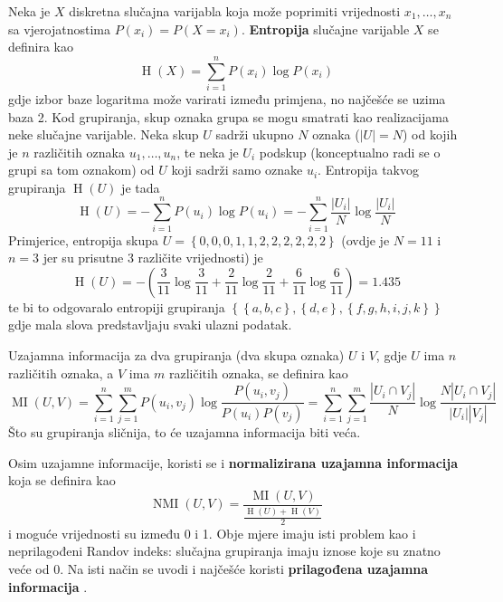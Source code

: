 \documentclass[times, utf8, zavrsni]{fer}
\begin{document}
Neka je $X$ diskretna slučajna varijabla koja može poprimiti vrijednosti $x_1, \dots, x_n$ sa vjerojatnostima $P \left(x_i\right) = P \left(X = x_i\right)$. \textbf{Entropija} slučajne varijable $X$ se definira kao
\[\operatorname{H} \left(X\right) = \sum_{i=1}^{n} P \left(x_i\right) \log{P \left(x_i\right)}\]
gdje izbor baze logaritma može varirati između primjena, no najčešće se uzima baza 2. Kod grupiranja, skup oznaka grupa se mogu smatrati kao realizacijama neke slučajne varijable. Neka skup $U$ sadrži ukupno $N$ oznaka ($\vert U \vert = N$) od kojih je $n$ različitih oznaka $u_1, \dots, u_n$, te neka je $U_i$ podskup (konceptualno radi se o grupi sa tom oznakom) od $U$ koji sadrži samo oznake $u_i$. Entropija takvog grupiranja $\operatorname{H} \left(U\right)$ je tada
\[\operatorname{H} \left(U\right) = 
- \sum_{i=1}^{n} P \left(u_i\right) \log{P \left(u_i\right)}
= - \sum_{i=1}^{n} \frac{\left\vert U_i \right\vert}{N}
\log{\frac{\left\vert U_i \right\vert}{N}}\]
Primjerice, entropija skupa $U = \left\{0, 0, 0, 1, 1, 2, 2, 2, 2, 2, 2\right\}$ (ovdje je $N = 11$ i $n = 3$ jer su prisutne 3 različite vrijednosti) je
\[\operatorname{H} \left(U\right) = - \left(\frac{3}{11} \log{\frac{3}{11}}
+ \frac{2}{11} \log{\frac{2}{11}}
+ \frac{6}{11} \log{\frac{6}{11}}\right) = 1.435
\]
te bi to odgovaralo entropiji grupiranja
$\left\{\left\{a, b, c\right\}, \left\{d, e\right\}, \left\{f, g, h, i, j, k\right\}\right\}$ gdje mala slova predstavljaju svaki ulazni podatak.

Uzajamna informacija za dva grupiranja (dva skupa oznaka) $U$ i $V$, gdje $U$ ima $n$ različitih oznaka, a $V$ ima $m$ različitih oznaka, se definira kao
\[\operatorname{MI} \left(U, V\right) = \sum_{i=1}^{n} \sum_{j=1}^{m} 
P \left(u_i, v_j\right) \log{\frac{P \left(u_i, v_j\right)}{P \left(u_i\right) P \left(v_j\right)}}
= \sum_{i=1}^{n} \sum_{j=1}^{m} 
\frac{\left\vert U_i \cap V_j \right\vert}{N} \log{\frac{N \left\vert U_i \cap V_j \right\vert}{\left\vert U_i \right\vert  \left\vert V_j \right\vert}}
\]
Što su grupiranja sličnija, to će uzajamna informacija biti veća.

Osim uzajamne informacije, koristi se i \textbf{normalizirana uzajamna informacija} koja se definira kao
\[\operatorname{NMI} \left(U, V\right) = \frac{\operatorname{MI} \left(U, V\right)}
{\frac{\operatorname{H} (U) + \operatorname{H} (V)}{2}}\]
i moguće vrijednosti su između 0 i 1. Obje mjere imaju isti problem kao i neprilagođeni Randov indeks: slučajna grupiranja imaju iznose koje su znatno veće od 0. Na isti način se uvodi i najčešće koristi \textbf{prilagođena uzajamna informacija} .
\end{document}

